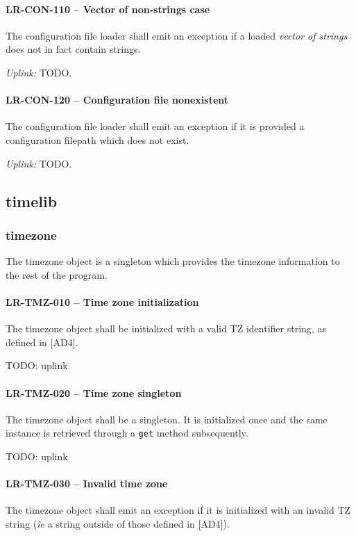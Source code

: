 \paragraph{LR-CON-110 -- Vector of non-strings case}
The configuration file loader shall emit an exception if a loaded
\emph{vector of strings} does not in fact contain strings.

\textit{Uplink: } TODO.

\paragraph{LR-CON-120 -- Configuration file nonexistent}
The configuration file loader shall emit an exception if it is provided
a configuration filepath which does not exist.

\textit{Uplink: } TODO.

\subsection{time\textunderscore lib}
\subsubsection{time\textunderscore zone}
The time\textunderscore zone object is a singleton which provides the
timezone information to the rest of the program.

\paragraph{LR-TMZ-010 -- Time zone initialization}
The timezone object shall be initialized with a valid TZ identifier string,
as defined in [AD4].

TODO: uplink
\paragraph{LR-TMZ-020 -- Time zone singleton}
The timezone object shall be a singleton. It is initialized once and the same
instance is retrieved through a \lstinline{get} method subsequently.

TODO: uplink
\paragraph{LR-TMZ-030 -- Invalid time zone}
The timezone object shall emit an exception if it is initialized with
an invalid TZ string (\textit{ie} a string outside of those defined in [AD4]).

